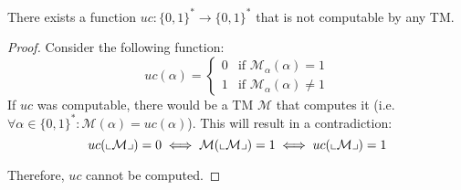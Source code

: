 \begin{theorem} \label{th:uncomputable_fn} 
    There exists a function $uc: \{0, 1\}^* \rightarrow \{0, 1\}^*$ that is not computable by any TM.

    \begin{proof}
        Consider the following function:
        \[ uc(\alpha) = \begin{cases}
            0 & \text{if $\mathcal{M}_\alpha(\alpha) = 1$} \\
            1 & \text{if $\mathcal{M}_\alpha(\alpha) \neq 1$}
        \end{cases} \]
        If $uc$ was computable, there would be a TM $\mathcal{M}$ that computes it (i.e. $\forall \alpha \in \{0, 1\}^*: \mathcal{M}(\alpha) = uc(\alpha)$).
        This will result in a contradiction:
        \[ uc({\llcorner{\mathcal{M}}\lrcorner}) = 0 \iff \mathcal{M}({\llcorner{\mathcal{M}}\lrcorner}) = 1 \iff uc({\llcorner{\mathcal{M}}\lrcorner}) = 1 \]

        Therefore, $uc$ cannot be computed.
    \end{proof}
\end{theorem}


